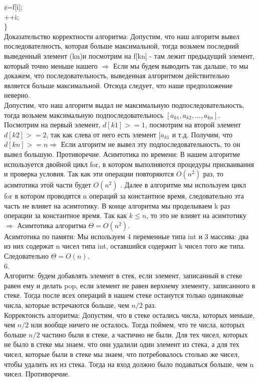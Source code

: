 \documentclass[a4paper,12pt]{article}
\begin{document}
\hspace*{20pt}  z=f[i];\\
\hspace*{20pt}  ++i;\\
\}\\
Доказательство корректности алгоритма:  Допустим, что наш алгоритм вывел последователность, которая больше максимальной, тогда возьмем последний выведенный элемент (kn)и посмотрим на f[kn] -  там лежит предыдущий элемент, который точно меньше нашего $ \Rightarrow$ Если мы будем выводить так дальше, то мы докажем, что последовательность, выведенная алгоритмом действительно является больше максимальной. Отсюда следует, что наше предположение неверно.\\
Допустим, что наш алгоритм выдал не максимальную подпоследовательность, тогда возьмем максимальную подпоследовательнось $[ a_{k1},a_{k2},...,a_{kn}]$. Посмотрим на первый элемент, $d[k1]>=1$, посмотрим на второй элемент $d[k2]>=2$, так как слева от него есть элемент $[ a_{k1}$ и т.д. Получим, что $d[kn]>=n \Rightarrow$   Если алгоритм не вывел эту подпоследовательность, то он вывел большую. Противоречие.
Асимтотика по времени: В нашем алгоритме используется двойной цикл for, в котором выполняются  процедуры присваивания и проверка условия. Так как эти операции повторяются $O(n^2)$ раз, то асимтотика этой части будет $O(n^2)$ .  Далее в алгоритме мы используем цикл for в котором проводятся n операций за константное время, следовательно эта часть не влияет на асимтотику. В конце алгоритма мы проделываем k раз операции за константное время. Так как $k \leqslant n$, то это не влияет на асимтотику $\Rightarrow$ Асимтотика алгоритма $\Theta = O(n^2)$.\\
Асимтотика по памяти: Мы используем 4 переменные типа int и 3 массива: два из них содержат n чисел типа int, оставшийся содержит k чисел того же типа. Следовательно $\Theta = O(n)$.\\
6.\\
Алгоритм: будем добавлять элемент в стек, если элемент, записанный в стеке равен ему и делать pop, если элемент не равен верхнему элементу, записанного в стеке. Тогда после всех операций в нашем стеке останутся только одинаковые числа, которые встречаются больше, чем  $n/2$ раз.\\
Корректонсть алгоритма: Допустим, что в стеке остались числа, которых меньше, чем $n/2$ или вообще ничего не осталось. Тогда поймем, что те числа, которых больше $n/2$ частино были в стеке, а частично не были. Для тех чисел, которых не было в стеке мы знаем, что они удалили один элемент из стека, а для тех чисел, которые были в стеке мы знаем, что потребовалось столько же чисел, чтобы удалить их из стека. Тогда на вход должно было подаваться больше, чем n чисел. Противоречие.
\end{document}
